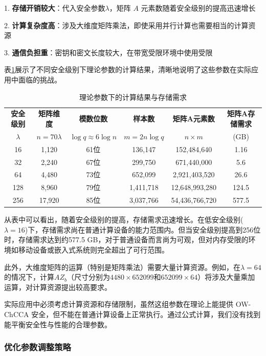 1. \textbf{存储开销较大}：代入安全参数$\lambda$，矩阵 $A$ 元素数随着安全级别的提高迅速增长

2. \textbf{计算复杂度高}：涉及大维度矩阵乘法，即使采用并行计算也需要相当的计算资源

3. \textbf{通信负担重}：密钥和密文长度较大，在带宽受限环境中使用受限

表\ref{tab:theoretical-params}展示了不同安全级别下理论参数的计算结果，清晰地说明了这些参数在实际应用中面临的挑战。

\begin{table}[ht]
  \centering
  \caption{理论参数下的计算结果与存储需求}
  \label{tab:theoretical-params}
  \begin{tabular}{|c|c|c|c|c|c|}
  \hline
  \textbf{安全级别} & \textbf{矩阵维度} & \textbf{模数位数} & \textbf{样本数} & \textbf{矩阵A元素数} & \textbf{矩阵A存储需求} \\
  $\lambda$ & $n = 70\lambda$ & $\log q \approx 6\log n$ & $m = 2n\log q$ & $n \times m$ & (GB) \\
  \hline
  16 & 1,120 & 61位 & 136,147 & 152,484,640 & 1.16 \\
  \hline
  32 & 2,240 & 67位 & 299,750 & 671,440,000 & 5.6 \\
  \hline
  64 & 4,480 & 73位 & 652,099 & 2,921,403,520 & 26.6 \\
  \hline
  128 & 8,960 & 79位 & 1,411,718 & 12,648,993,280 & 124.5 \\
  \hline
  256 & 17,920 & 85位 & 3,037,766 & 54,436,766,720 & 577.5 \\
  \hline
  \end{tabular}
\end{table}

从表中可以看出，随着安全级别的提高，存储需求迅速增长。在低安全级别($\lambda = 16$)下，存储需求尚在普通计算设备的能力范围内。但当安全级别提高到256位时，存储需求达到约577.5 GB，对于普通设备而言尚为可观，但对内存受限的环境如移动设备或嵌入式系统则完全超出了可行范围。

此外，大维度矩阵的运算（特别是矩阵乘法）需要大量计算资源。例如，在$\lambda = 64$的情况下，计算$AZ_b$（尺寸分别为$4480 \times 652099$和$652099 \times 64$）将涉及大量乘加运算，对计算资源提出较高要求。

实际应用中必须考虑计算资源和存储限制，虽然这组参数在理论上能提供 OW-ChCCA 安全，但不能在普通计算设备上正常执行。通过公式计算，我们没有找到能平衡安全性与性能的合理参数。

\subsubsection{优化参数调整策略}

